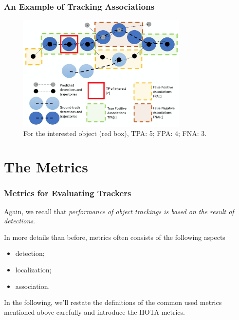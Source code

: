 \documentclass[slidetop, mathserif]{beamer}
\begin{document}
\begin{frame}
	\frametitle{An Example of Tracking Associations}
	\begin{figure}
		\includegraphics[width=240pt]{pics/fig8.png}
		\caption{For the interested object (red box), TPA: 5; FPA: 4; FNA: 3.}
	\end{figure}
\end{frame}

\section{The Metrics}

\begin{frame}
	\frametitle{Metrics for Evaluating Trackers}
			
	Again, we recall that \emph{performance of object trackings is based 
	on the result of detections}.
			
	\vspace{5pt}

	In more details than before,
	metrics often consists of the following aspects
	\begin{itemize}
		\item detection;%
		\item localization;%
		\item association.%
	\end{itemize}

	In the following, we'll restate the definitions of the common used metrics
	mentioned above carefully and introduce the HOTA metrics.

\end{frame}

\end{document}
